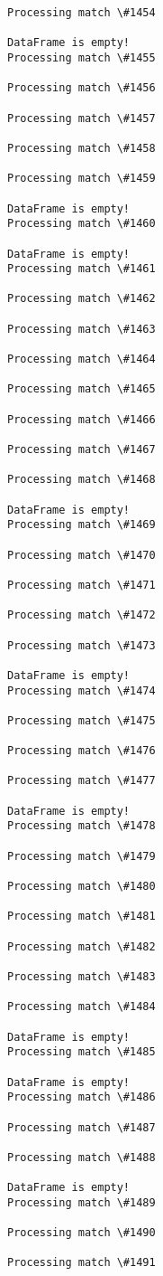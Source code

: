 \documentclass[11pt]{article}
\begin{document}
\begin{Verbatim}[commandchars=\\\{\}]
Processing match \#1454

DataFrame is empty!
Processing match \#1455

Processing match \#1456

Processing match \#1457

Processing match \#1458

Processing match \#1459

DataFrame is empty!
Processing match \#1460

DataFrame is empty!
Processing match \#1461

Processing match \#1462

Processing match \#1463

Processing match \#1464

Processing match \#1465

Processing match \#1466

Processing match \#1467

Processing match \#1468

DataFrame is empty!
Processing match \#1469

Processing match \#1470

Processing match \#1471

Processing match \#1472

Processing match \#1473

DataFrame is empty!
Processing match \#1474

Processing match \#1475

Processing match \#1476

Processing match \#1477

DataFrame is empty!
Processing match \#1478

Processing match \#1479

Processing match \#1480

Processing match \#1481

Processing match \#1482

Processing match \#1483

Processing match \#1484

DataFrame is empty!
Processing match \#1485

DataFrame is empty!
Processing match \#1486

Processing match \#1487

Processing match \#1488

DataFrame is empty!
Processing match \#1489

Processing match \#1490

Processing match \#1491


\end{Verbatim}
\end{document}
